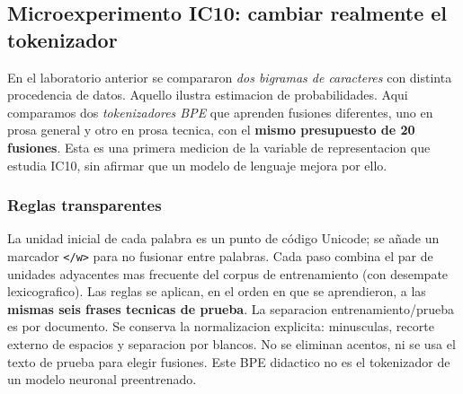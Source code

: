 


\subsection{Microexperimento IC10: cambiar realmente el tokenizador}
\label{s01:lab:ic10}
\begin{idea}
En el laboratorio anterior se compararon \emph{dos bigramas de caracteres}
con distinta procedencia de datos. Aquello ilustra estimacion de
probabilidades. Aqui comparamos dos \emph{tokenizadores BPE} que aprenden
fusiones diferentes, uno en prosa general y otro en prosa tecnica, con el
\textbf{mismo presupuesto de 20 fusiones}. Esta es una primera medicion de
la variable de representacion que estudia IC10, sin afirmar que un
modelo de lenguaje mejora por ello.
\end{idea}
\subsubsection*{Reglas transparentes}
La unidad inicial de cada palabra es un punto de código Unicode; se añade
un marcador \texttt{</w>} para no fusionar entre palabras. Cada paso combina
el par de unidades adyacentes mas frecuente del corpus de entrenamiento
(con desempate lexicografico). Las reglas se aplican, en el orden en que
se aprendieron, a las \textbf{mismas seis frases tecnicas de prueba}.
La separacion entrenamiento/prueba es por documento. Se conserva la
normalizacion explicita: minusculas, recorte externo de espacios y
separacion por blancos. No se eliminan acentos, ni se usa el texto de
prueba para elegir fusiones. Este BPE didactico no es el tokenizador de
un modelo neuronal preentrenado.
